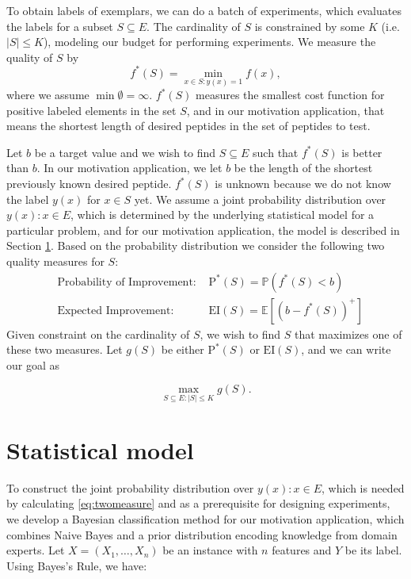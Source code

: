 \documentclass[opre,nonblindrev]{informs3} %
\newcommand{\E}{\mathbb{E}}
\newcommand{\EI}{\mathrm{EI}}
\newcommand{\PI}{\text{P}^*}
\begin{document}
To obtain labels of exemplars, we can do a batch of experiments, which evaluates the labels for a subset $S \subseteq E$. The cardinality of $S$ is constrained by some $K$ (i.e. $|S| \leq K$), modeling our budget for performing experiments. We measure the quality of $S$ by 
\begin{equation} \label{eq:fS}
f^*(S)= \underset{x \in S:y(x)=1}{\min} f(x),
\end{equation}
where we assume $\min \emptyset = \infty$. $f^*(S)$ measures the smallest cost function for positive labeled elements in the set $S$, and in our motivation application, that means the shortest length of desired peptides in the set of peptides to test.


Let $b$ be a target value and we wish to find $S\subseteq E$ such that $f^*(S)$ is better than $b$. In our motivation application, we let $b$ be the length of the shortest previously known desired peptide. $f^*(S)$ is unknown because we do not know the label $y(x)$ for $x \in S$ yet. We assume a joint probability distribution over $y(x): x \in E$, which is determined by the underlying statistical model for a particular problem, and for our motivation application, the model is described in Section \ref{sec:stat model}. Based on the probability distribution we consider the following two quality measures for $S$:
\begin{equation} \label{eq:twomeasure}
  \begin{aligned}
    &\text{Probability of Improvement: }&\PI(S) = \mathbb{P}(f^*(S) < b)\\
    &\text{Expected Improvement: }&\EI(S) = \E [(b-f^*(S))^+]
  \end{aligned}
\end{equation}
Given constraint on the cardinality of $S$, we wish to find $S$ that maximizes one of these two measures. Let $g(S)$ be either $\PI(S)$ or $\EI(S)$, and we can write our goal as

\begin{equation}
  \max_{S \subseteq E: |S| \leq K} g(S). 
  \label{eq:opt}
\end{equation}

\section{Statistical model} \label{sec:stat model}
To construct the joint probability distribution over $y(x): x \in E$, which is needed by calculating \eqref{eq:twomeasure} and as a prerequisite for designing experiments, we develop a Bayesian classification method for our motivation application, which combines Naive Bayes and a prior distribution encoding knowledge from domain experts. Let $X=(X_1,\ldots,X_n)$ be an instance with $n$ features and $Y$ be its label. Using Bayes's Rule, we have:
\end{document}
